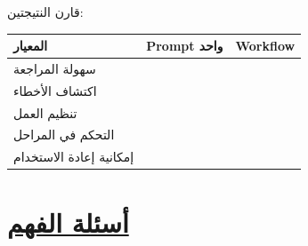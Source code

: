 \documentclass[a4paper]{article}
\begin{document}
قارن النتيجتين:

\begin{center}

\begin{tabular}{|
>{\raggedleft\arraybackslash}m{4cm}|
>{\centering\arraybackslash}m{4cm}|
>{\centering\arraybackslash}m{4cm}|}

\hline

\textbf{المعيار}
&
\textbf{Prompt واحد}
&
\textbf{Workflow}
\\

\hline

سهولة المراجعة
&
&
\\[0.8cm]

\hline

اكتشاف الأخطاء
&
&
\\[0.8cm]

\hline

تنظيم العمل
&
&
\\[0.8cm]

\hline

التحكم في المراحل
&
&
\\[0.8cm]

\hline

إمكانية إعادة الاستخدام
&
&
\\[0.8cm]

\hline

\end{tabular}

\end{center}



\section*{\khatt\underline{أسئلة الفهم}}
\end{document}
